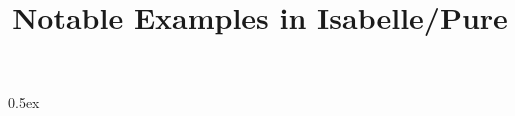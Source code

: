 \documentclass[11pt,a4paper]{article}
\begin{document}
\title{Notable Examples in Isabelle/Pure}
\maketitle

\parindent 0pt \parskip 0.5ex





\end{document}
